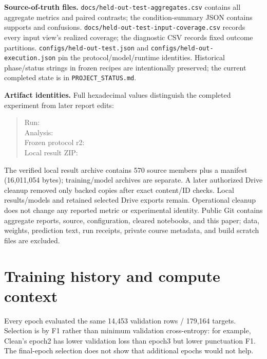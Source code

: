 \documentclass{article}
\begin{document}
\textbf{Source-of-truth files.} \texttt{docs/held-out-test-aggregates.csv} contains
all aggregate metrics and paired contrasts; the condition-summary JSON contains
supports and confusions. \texttt{docs/held-out-test-input-coverage.csv} records
every input view's realized coverage; the diagnostic CSV records fixed outcome
partitions. \texttt{configs/held-out-test.json} and
\texttt{configs/held-out-execution.json} pin the protocol/model/runtime identities.
Historical phase/status strings in frozen recipes are intentionally preserved;
the current completed state is in \texttt{PROJECT\_STATUS.md}.

\textbf{Artifact identities.} Full hexadecimal values distinguish the completed
experiment from later report edits:
\begin{quote}\footnotesize\raggedright
Run: \\
Analysis: \\
Frozen protocol r2: \\
Local result ZIP: 
\end{quote}

The verified local result archive contains 570 source members plus a manifest
(16,011,054 bytes); training/model archives are separate. A later authorized
Drive cleanup removed only backed copies after exact content/ID checks. Local
results/models and retained selected Drive exports remain. Operational cleanup
does not change any reported metric or experimental identity. Public Git contains
aggregate reports, source, configuration, cleared notebooks, and this paper;
data, weights, prediction text, run receipts, private course metadata, and build
scratch files are excluded.

\section{Training history and compute context}
\begin{table}[h]
\centering\small
\caption{Original training-time clean-validation macro-F1 (\%). Bold values
are selected epoch exports, using the same prespecified F1 rule in each arm.}
\TrainingHistory
\end{table}
Every epoch evaluated the same 14,453 validation rows / 179,164 targets.
Selection is by F1 rather than minimum validation cross-entropy: for example,
Clean's epoch2 has lower validation loss than epoch3 but lower punctuation F1.
The final-epoch selection does not show that additional epochs would not help.
\end{document}
